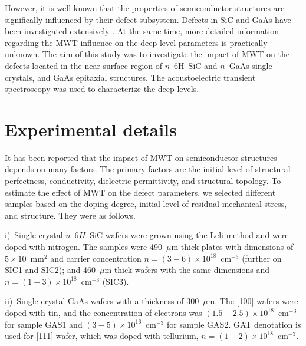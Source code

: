 \documentclass[10pt]{iopart}
\begin{document}
However, it is well known that the properties of semiconductor structures are significally influenced by their defect subsystem.
Defects in SiC and GaAs have been investigated extensively \cite{6HSiC:VV2019,SiCWei,GAPel2020,GASobolev2020}.
At the same time,
more detailed information regarding the MWT influence on the deep level parameters is practically unknown.
The aim of this study was to investigate the impact of MWT on the defects located in the near-surface region
of $n$--6H--SiC and $n$--GaAs single crystals,
and  GaAs  epitaxial structures.
The  acoustoelectric  transient spectroscopy was used to characterize the deep levels.

\section{Experimental details}\label{sec:Exp}

It has been reported \cite{BoltovetsEn,Milenin1994En,BelyaevIntac,ASHKINADZE1996,ProcSPIE} that
the impact of MWT on semiconductor structures depends on many factors.
The primary factors are the initial level of structural perfectness, conductivity, dielectric permittivity, and structural topology.
To estimate the effect of MWT on the defect parameters, we selected different samples based on the doping degree, initial level of residual mechanical stress, and structure.
They were as follows.

\noindent
i)~Single-crystal $n$--6$H$--SiC wafers were grown using the Leli method and were doped with nitrogen.
   The samples were  490~$\mu$m-thick plates with dimensions of $5\times10$~mm$^2$ and  carrier concentration $n=(3-6)\times10^{18}$~cm$^{-3}$
    (further on SIC1 and SIC2);
    and 460~$\mu$m thick wafers with the same dimensions and $n=(1-3)\times10^{18}$~cm$^{-3}$ (SIC3).

\noindent
ii)~Single-crystal GaAs  wafers with a thickness of 300~$\mu$m.
   The [100] wafers were  doped with tin, and the concentration of electrons was $(1.5-2.5)\times10^{18}$~cm$^{-3}$
   for sample  GAS1 and $(3-5)\times10^{16}$~cm$^{-3}$ for sample GAS2.
   GAT denotation is used for [111] wafer, which was doped with tellurium,
   $n = (1-2)\times10^{18}$~cm$^{-3}$.
\end{document}
